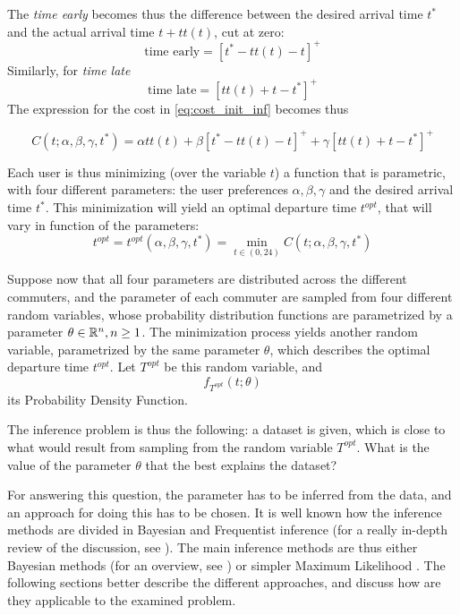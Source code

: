 The \textit{time early} becomes thus the difference between the desired arrival time \(t^*\) and the actual arrival time \(t + tt(t)\), cut at zero:
\[\text{time early} = [t^* - tt(t) - t]^+\]
Similarly, for \textit{time late}
\[\text{time late} = [tt(t) + t - t^*]^+\]
The expression for the cost in \eqref{eq:cost_init_inf} becomes thus

\begin{equation}
  \label{eq:cost_inf}
  C(t; \alpha, \beta, \gamma, t^*) = \alpha tt(t) + \beta [t^* - tt(t) - t]^+ + \gamma[tt(t) + t - t^*]^+
\end{equation}

Each user is thus minimizing (over the variable \(t\))
a function that is parametric, with four different parameters:
the user preferences \(\alpha, \beta, \gamma\) and the desired arrival time \(t^*\).
This minimization will yield an optimal departure time \(t^{opt}\),
that will vary in function of the parameters:
\begin{equation}
  \label{eq:t_opt}
  t^{opt} = t^{opt}(\alpha, \beta, \gamma, t^*) = \min_{t \in (0, 24)} C(t; \alpha, \beta, \gamma, t^*)
\end{equation}

Suppose now that all four parameters are distributed across the different commuters,
and the parameter of each commuter are sampled from four different random variables,
whose probability distribution functions are parametrized by a parameter \(\theta \in \mathbb{R}^n, n \geq 1\).
The minimization process yields another random variable, parametrized by the same parameter \(\theta\),
which describes the optimal departure time \(t^{opt}\).
Let \(T^{opt}\) be this random variable, and
\begin{equation}
  \label{eq:pdf_opt}
  f_{T^{opt}}(t; \theta)
\end{equation}
its Probability Density Function.

The inference problem is thus the following:
a dataset is given,
which is close to what would result from sampling from the random variable \(T^{opt}\).
What is the value of the parameter \(\theta\) that the best explains the dataset?

For answering this question, the parameter has to be inferred from the data,
and an approach for doing this has to be chosen.
It is well known how the inference methods are divided in Bayesian and Frequentist inference
(for a really in-depth review of the discussion, see \cite{bandyopadhyay2011philosophy}).
The main inference methods are thus either Bayesian methods (for an overview, see \cite{gelman2013bayesian}) or simpler Maximum Likelihood \parencite{doi:10.1098/rsta.1922.0009}.
The following sections better describe the different approaches,
and discuss how are they applicable to the examined problem.

